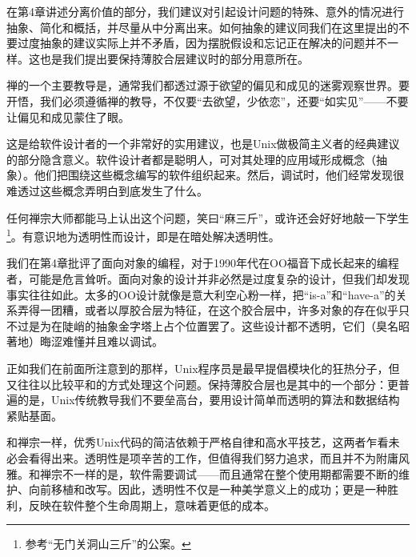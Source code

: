 \documentclass[12pt,oneside]{book}
\begin{document}
在第4章讲述分离价值的部分，我们建议对引起设计问题的特殊、意外的情况进行抽象、简化和概括，并尽量从中分离出来。如何抽象的建议同我们在这里提出的不要过度抽象的建议实际上并不矛盾，因为摆脱假设和忘记正在解决的问题并不一样。这也是我们提出要保持薄胶合层建议时的部分用意所在。

禅的一个主要教导是，通常我们都透过源于欲望的偏见和成见的迷雾观察世界。要开悟，我们必须遵循禅的教导，不仅要“去欲望，少依恋”，还要“如实见”——不要让偏见和成见蒙住了眼。

这是给软件设计者的一个非常好的实用建议，也是Unix做极简主义者的经典建议的部分隐含意义。软件设计者都是聪明人，可对其处理的应用域形成概念（抽象）。他们把围绕这些概念编写的软件组织起来。然后，调试时，他们经常发现很难透过这些概念弄明白到底发生了什么。

任何禅宗大师都能马上认出这个问题，笑曰“麻三斤”，或许还会好好地敲一下学生\footnote{参考“无门关洞山三斤”的公案\cite{Mumon}。}。有意识地为透明性而设计，即是在暗处解决透明性。

我们在第4章批评了面向对象的编程，对于1990年代在OO福音下成长起来的编程者，可能是危言耸听。面向对象的设计并非必然是过度复杂的设计，但我们却发现事实往往如此。太多的OO设计就像是意大利空心粉一样，把“is-a”和“have-a”的关系弄得一团糟，或者以厚胶合层为特征，在这个胶合层中，许多对象的存在似乎只不过是为在陡峭的抽象金字塔上占个位置罢了。这些设计都不透明，它们（臭名昭著地）晦涩难懂并且难以调试。

正如我们在前面所注意到的那样，Unix程序员是最早提倡模块化的狂热分子，但又往往以比较平和的方式处理这个问题。保持薄胶合层也是其中的一个部分：更普遍的是，Unix传统教导我们不要垒高台，要用设计简单而透明的算法和数据结构紧贴基面。

和禅宗一样，优秀Unix代码的简洁依赖于严格自律和高水平技艺，这两者乍看未必会看得出来。透明性是项辛苦的工作，但值得我们努力追求，而且并不为附庸风雅。和禅宗不一样的是，软件需要调试——而且通常在整个使用期都需要不断的维护、向前移植和改写。因此，透明性不仅是一种美学意义上的成功；更是一种胜利，反映在软件整个生命周期上，意味着更低的成本。
\end{document}
